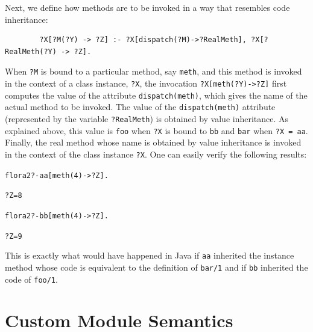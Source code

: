 \documentclass[11pt]{article}
\newcommand{\prompt}{flora2 ?- }
\begin{document}
Next, we define how methods are to be invoked in a way that resembles
code inheritance:
\begin{verbatim}
        ?X[?M(?Y) -> ?Z] :- ?X[dispatch(?M)->?RealMeth], ?X[?RealMeth(?Y) -> ?Z].
\end{verbatim}
When {\tt ?M} is bound to a particular method, say {\tt meth}, and this
method is invoked in the context of a class instance, {\tt ?X}, the
invocation {\tt ?X[meth(?Y)->?Z]} first computes the value of the attribute
{\tt dispatch(meth)}, which gives the name of the actual method to be
invoked. The value of the {\tt dispatch(meth)} attribute (represented by
the variable {\tt ?RealMeth}) is obtained by
value inheritance.  As explained above, this value is
{\tt foo} when {\tt ?X} is bound to {\tt bb} and {\tt bar} when {\tt ?X =
  aa}.  Finally, the real method whose name is obtained by value
inheritance is invoked in the context of the class instance {\tt ?X}.  One
can easily verify the following results:
\begin{alltt}
    \prompt aa[meth(4) -> ?Z].

    ?Z = 8

    \prompt bb[meth(4) -> ?Z].

    ?Z = 9
\end{alltt}
This is exactly what would have happened in Java if {\tt aa} inherited
the instance method whose code is equivalent to the definition of
{\tt bar/1} and if {\tt bb} inherited the code of {\tt foo/1}.  


\section{Custom Module Semantics}\label{sec-semantics-directive}
\end{document}
